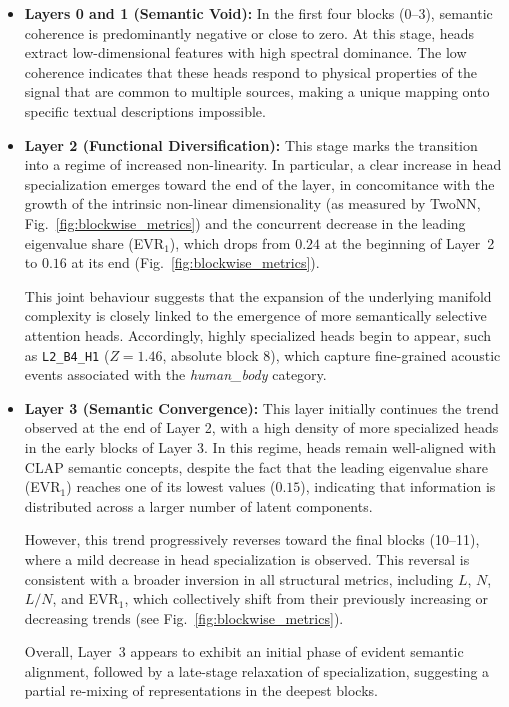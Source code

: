 \begin{itemize}
    \item \textbf{Layers 0 and 1 (Semantic Void):} In the first four blocks
    (0--3), semantic coherence is predominantly negative or close to zero.
    At this stage, heads extract low-dimensional features
    with high spectral dominance. The low coherence indicates that these
    heads respond to physical properties of the signal that are common to
    multiple sources, making a unique mapping onto specific textual
    descriptions impossible.
    \item \textbf{Layer 2 (Functional Diversification):} This stage marks
    the transition into a regime of increased non-linearity. In particular,
    a clear increase in head specialization emerges toward the end of the layer,
    in concomitance with the growth of the intrinsic non-linear dimensionality
    (as measured by TwoNN, Fig.~\ref{fig:blockwise_metrics}) and the concurrent
    decrease in the leading eigenvalue share (EVR$_1$), which drops from $0.24$
    at the beginning of Layer~2 to $0.16$ at its end (Fig.~\ref{fig:blockwise_metrics}).
 
    This joint behaviour suggests that the expansion of the underlying manifold
    complexity is closely linked to the emergence of more semantically selective
    attention heads. Accordingly, highly specialized heads begin to appear,
    such as \texttt{L2\_B4\_H1} ($Z=1.46$, absolute block 8), which capture
    fine-grained acoustic events associated with the \textit{human\_body} category.
    \item \textbf{Layer 3 (Semantic Convergence):} This layer initially continues the trend
    observed at the end of Layer 2, with a high density of more specialized heads in the
    early blocks of Layer 3. In this regime, heads remain well-aligned with CLAP semantic
    concepts, despite the fact that the leading eigenvalue share (EVR$_1$) reaches one of its
    lowest values ($0.15$), indicating that information is distributed across a larger number
    of latent components.
 
    However, this trend progressively reverses toward the final blocks (10--11), where a
    mild decrease in head specialization is observed. This reversal is consistent with a
    broader inversion in all structural metrics, including $L$, $N$, $L/N$, and EVR$_1$,
    which collectively shift from their previously increasing or decreasing trends
    (see Fig.~\ref{fig:blockwise_metrics}). 
 
    Overall, Layer~3 appears to exhibit an initial phase of evident semantic alignment,
    followed by a late-stage relaxation of specialization, suggesting a partial
    re-mixing of representations in the deepest blocks.
\end{itemize}
 
